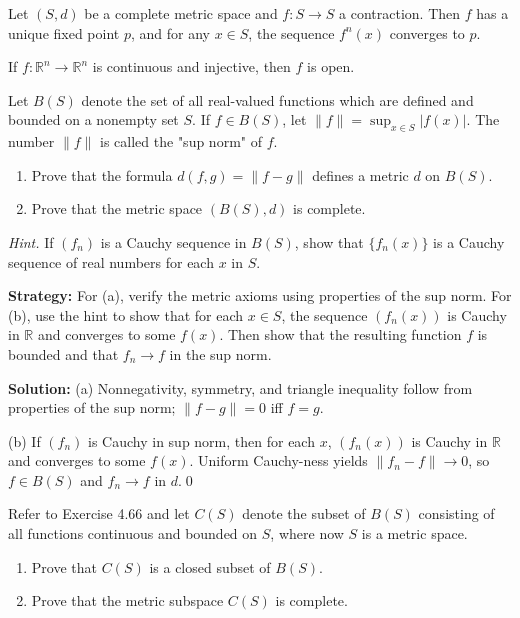 \begin{theorem}
Let $(S,d)$ be a complete metric space and $f: S \to S$ a contraction. Then $f$ has a unique fixed point $p$, and for any $x \in S$, the sequence $f^n(x)$ converges to $p$.
\end{theorem}

\begin{theorem}
If $f: \mathbb{R}^n \to \mathbb{R}^n$ is continuous and injective, then $f$ is open.
\end{theorem}



\begin{problembox}
Let $B(S)$ denote the set of all real-valued functions which are defined and bounded on a nonempty set $S$. If $f \in B(S)$, let $\|f\| = \sup_{x \in S} |f(x)|$. The number $\|f\|$ is called the "sup norm" of $f$.
\begin{enumerate}[label=(\alph*)]
\item Prove that the formula $d(f, g) = \|f - g\|$ defines a metric $d$ on $B(S)$.
\item Prove that the metric space $(B(S), d)$ is complete. 
\end{enumerate}
\textit{Hint.} If $(f_n)$ is a Cauchy sequence in $B(S)$, show that $\{f_n(x)\}$ is a Cauchy sequence of real numbers for each $x$ in $S$.
\end{problembox}

\noindent\textbf{Strategy:} For (a), verify the metric axioms using properties of the sup norm. For (b), use the hint to show that for each $x \in S$, the sequence $(f_n(x))$ is Cauchy in $\mathbb{R}$ and converges to some $f(x)$. Then show that the resulting function $f$ is bounded and that $f_n \to f$ in the sup norm.

\bigskip\noindent\textbf{Solution:}
(a) Nonnegativity, symmetry, and triangle inequality follow from properties of the sup norm; $\|f-g\|=0$ iff $f=g$.

(b) If $(f_n)$ is Cauchy in sup norm, then for each $x$, $(f_n(x))$ is Cauchy in $\mathbb{R}$ and converges to some $f(x)$. Uniform Cauchy-ness yields $\|f_n-f\|\to 0$, so $f\in B(S)$ and $f_n\to f$ in $d$.\qed



\begin{problembox}
Refer to Exercise 4.66 and let $C(S)$ denote the subset of $B(S)$ consisting of all functions continuous and bounded on $S$, where now $S$ is a metric space.
\begin{enumerate}[label=(\alph*)]
\item Prove that $C(S)$ is a closed subset of $B(S)$.
\item Prove that the metric subspace $C(S)$ is complete.
\end{enumerate}
\end{problembox}

